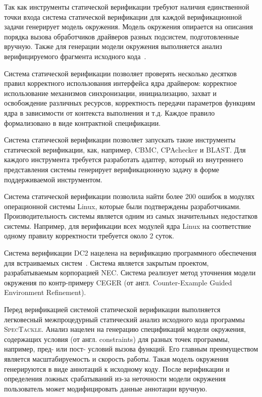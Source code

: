 \documentclass[%
candidate,     %
href,        %
colorlinks,  %
]{disser}
\begin{document}
Так как инструменты статической верификации требуют наличия единственной точки входа система статической верификации для каждой верификационной задачи генерирует модель окружения.
Модель окружения опирается на описания порядка вызова обработчиков драйверов разных подсистем, подготовленные вручную.
Также для генерации модели окружения выполняется анализ верифицируемого фрагмента исходного кода~\cite{ZakharovEnv2015}.

Система статической верификации позволяет проверять несколько десятков правил корректного использования интерфейса ядра драйвером: корректное использование механизмов синхронизации, инициализацию, захват и освобождение различных ресурсов, корректность передачи параметров функциям ядра в зависимости от контекста выполнения и т.д.
Каждое правило формализовано в виде контрактной спецификации.

Система статической верификации позволяет запускать такие инструменты статической верификации, как, например, CBMC, CPAchecker и BLAST.
Для каждого инструмента требуется разработать адаптер, который из внутреннего представления системы генерирует верификационную задачу в форме поддерживаемой инструментом.

Система статической верификации позволила найти более 200 ошибок в модулях операционной системы Linux, которые были подтверждены разработчиками.
Производительность системы является одним из самых значительных недостатков системы.
Например, для верификации всех модулей ядра Linux на соответствие одному правилу корректности требуется около 2 суток.

Система верификации DC2 нацелена на верификацию программного обеспечения для встраиваемых систем~\cite{Ivancic:2015:SSS}.
Система является закрытым проектом, разрабатываемым корпорацией NEC.
Система реализует метод уточнения модели окружения по контр-примеру CEGER (от англ. Counter-Example Guided Environment Refinement).

Перед верификацией системой статической верификации выполняется легковесный межпроцедурный статический анализ исходного кода программы \textsc{SpecTackle}.
Анализ нацелен на генерацию спецификаций модели окружения, содержащих условия (от англ. constraints) для разных точек программы, например, пред- или пост- условий вызова функций.
Его главным преимуществом является масштабируемость и скорость работы.
Такая модель окружения генерируются в виде аннотаций к исходному коду.
После верификации и определения ложных срабатываний из-за неточности модели окружения пользователь может модифицировать данные аннотации вручную.
\end{document}

